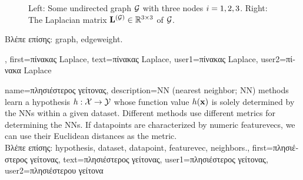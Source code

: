 {{\begin{figure}[H]
\begin{center}
\begin{minipage}{0.45\textwidth}
\begin{equation}
	 				 		 \end{equation} 
	 			 \end{minipage}
	 	 \caption{\label{fig_lap_mtx_dict} Left: Some undirected \gls{graph} $\mathcal{G}$ with three nodes $i=1,2,3$. 
	 		 	Right: The Laplacian matrix ${\bf L}^{(\mathcal{G})}  \in \mathbb{R}^{3 \times 3}$ of $\mathcal{G}$.} 
	 		 	\end{center}
	 		\end{figure}
			\foreignlanguage{greek}{Βλέπε επίσης:} \gls{graph}, \gls{edgeweight}.
	},
	first={\foreignlanguage{greek}{πίνακας} Laplace},
	text={\foreignlanguage{greek}{πίνακας} Laplace},
	user1={\foreignlanguage{greek}{πίνακας} Laplace}, %
  	user2={\foreignlanguage{greek}{πίνακα} Laplace} %
}

{name={\foreignlanguage{greek}{πλησιέστερος γείτονας}},
	description={NN (nearest neighbor; NN) methods learn a \gls{hypothesis} 
		$h: \mathcal{X} \rightarrow \mathcal{Y}$ whose function value $h({\bf x})$ 
		is solely determined by the NNs within a given \gls{dataset}. Different 
		methods use different metrics for determining the NNs. If \gls{datapoint}s 
		are characterized by numeric \gls{featurevec}s, we can use their Euclidean distances as 
		the metric.\\
		\foreignlanguage{greek}{Βλέπε επίσης:} \gls{hypothesis}, \gls{dataset}, \gls{datapoint}, \gls{featurevec}, \gls{neighbors}.},
	first={\foreignlanguage{greek}{πλησιέστερος γείτονας}},
	text={\foreignlanguage{greek}{πλησιέστερος γείτονας}},
	user1={\foreignlanguage{greek}{πλησιέστερος γείτονας}}, %
   	user2={\foreignlanguage{greek}{πλησιέστερου γείτονα}} %
}

